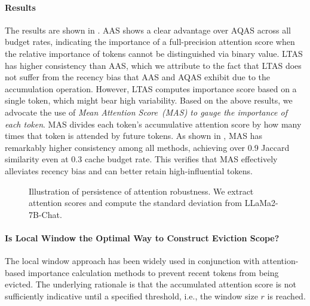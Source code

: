 \paragraph{Results} The results are shown in . AAS shows a clear advantage over AQAS across all budget rates, indicating the importance of a full-precision attention score when the relative importance of tokens cannot be distinguished via binary value. LTAS has higher consistency than AAS, which we attribute to the fact that 
LTAS does not suffer from the recency bias that AAS and AQAS exhibit due to the accumulation operation. However, LTAS computes importance score based on a single token, which might bear high variability. Based on the above results, we advocate the use of \textit{Mean Attention Score~(MAS) to gauge the importance of each token}. MAS divides each token's accumulative attention score by how many times that token is attended by future tokens. As shown in , MAS has remarkably higher consistency among all methods, achieving over 0.9 Jaccard similarity even at 0.3 cache budget rate. This verifies that MAS effectively alleviates recency bias and can better retain high-influential tokens.
\begin{figure}[t]
	\centering
    \caption{Illustration of persistence of attention robustness. We extract attention scores and compute the standard deviation from LLaMa2-7B-Chat.}
	\label{fig:std}
\end{figure}

\paragraph{Is Local Window the Optimal Way to Construct Eviction Scope?} 
The local window approach has been widely used in conjunction with attention-based importance calculation methods to prevent recent tokens from being evicted. The underlying rationale is that the accumulated attention score is not sufficiently indicative until a specified threshold, i.e., the window size $r$ is reached. 

